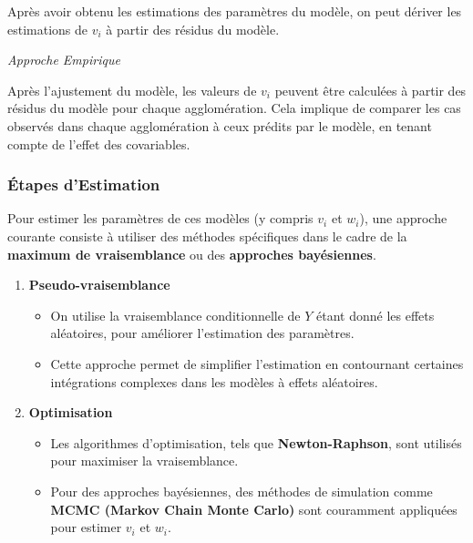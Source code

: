 \documentclass[
]{article}
\providecommand{\tightlist}{%
  \setlength{\itemsep}{0pt}\setlength{\parskip}{0pt}}
\begin{document}
Après avoir obtenu les estimations des paramètres du modèle, on peut
dériver les estimations de \(v_i\) à partir des résidus du modèle.

\emph{Approche Empirique}

Après l'ajustement du modèle, les valeurs de \(v_i\) peuvent être
calculées à partir des résidus du modèle pour chaque agglomération. Cela
implique de comparer les cas observés dans chaque agglomération à ceux
prédits par le modèle, en tenant compte de l'effet des covariables.

\hypertarget{uxe9tapes-destimation}{%
\subsubsection{Étapes d'Estimation}\label{uxe9tapes-destimation}}

Pour estimer les paramètres de ces modèles (y compris \(v_i\) et
\(w_i\)), une approche courante consiste à utiliser des méthodes
spécifiques dans le cadre de la \textbf{maximum de vraisemblance} ou des
\textbf{approches bayésiennes}.

\begin{enumerate}
\def\labelenumi{\arabic{enumi}.}
\tightlist
\item
  \textbf{Pseudo-vraisemblance}

  \begin{itemize}
  \tightlist
  \item
    On utilise la vraisemblance conditionnelle de \(Y\) étant donné les
    effets aléatoires, pour améliorer l'estimation des paramètres.
  \item
    Cette approche permet de simplifier l'estimation en contournant
    certaines intégrations complexes dans les modèles à effets
    aléatoires.
  \end{itemize}
\item
  \textbf{Optimisation}

  \begin{itemize}
  \tightlist
  \item
    Les algorithmes d'optimisation, tels que \textbf{Newton-Raphson},
    sont utilisés pour maximiser la vraisemblance.
  \item
    Pour des approches bayésiennes, des méthodes de simulation comme
    \textbf{MCMC (Markov Chain Monte Carlo)} sont couramment appliquées
    pour estimer \(v_i\) et \(w_i\).
  \end{itemize}
\end{enumerate}
\end{document}
